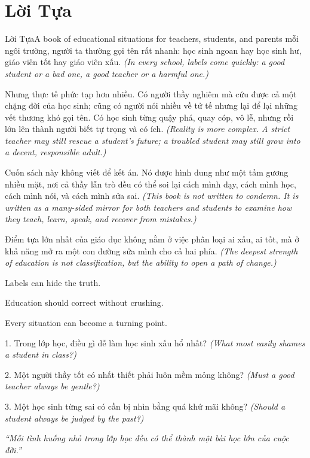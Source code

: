 \chapter*{Lời Tựa}

\begin{truyen}{Lời Tựa}{A book of educational situations for teachers, students, and parents}
 mỗi ngôi trường, người ta thường gọi tên rất nhanh: học sinh ngoan hay học sinh hư, giáo viên tốt hay giáo viên xấu.
\textit{(In every school, labels come quickly: a good student or a bad one, a good teacher or a harmful one.)}

Nhưng thực tế phức tạp hơn nhiều. Có người thầy nghiêm mà cứu được cả một chặng đời của học sinh; cũng có người nói nhiều về tử tế nhưng lại để lại những vết thương khó gọi tên. Có học sinh từng quậy phá, quay cóp, vô lễ, nhưng rồi lớn lên thành người biết tự trọng và có ích.
\textit{(Reality is more complex. A strict teacher may still rescue a student's future; a troubled student may still grow into a decent, responsible adult.)}

Cuốn sách này không viết để kết án. Nó được hình dung như một tấm gương nhiều mặt, nơi cả thầy lẫn trò đều có thể soi lại cách mình dạy, cách mình học, cách mình nói, và cách mình sửa sai.
\textit{(This book is not written to condemn. It is written as a many-sided mirror for both teachers and students to examine how they teach, learn, speak, and recover from mistakes.)}
\end{truyen}

\begin{baihoc}
Điểm tựa lớn nhất của giáo dục không nằm ở việc phân loại ai xấu, ai tốt, mà ở khả năng mở ra một con đường sửa mình cho cả hai phía.
\textit{(The deepest strength of education is not classification, but the ability to open a path of change.)}
\end{baihoc}

\begin{ghinhoanh}
Labels can hide the truth.

Education should correct without crushing.

Every situation can become a turning point.
\end{ghinhoanh}

\begin{tuhocnhanh}
1. Trong lớp học, điều gì dễ làm học sinh xấu hổ nhất? \textit{(What most easily shames a student in class?)}

2. Một người thầy tốt có nhất thiết phải luôn mềm mỏng không? \textit{(Must a good teacher always be gentle?)}

3. Một học sinh từng sai có cần bị nhìn bằng quá khứ mãi không? \textit{(Should a student always be judged by the past?)}
\end{tuhocnhanh}

\begin{center}
\textit{\color{truyengold}``Mỗi tình huống nhỏ trong lớp học đều có thể thành một bài học lớn của cuộc đời.''}
\end{center}

\ngancach
